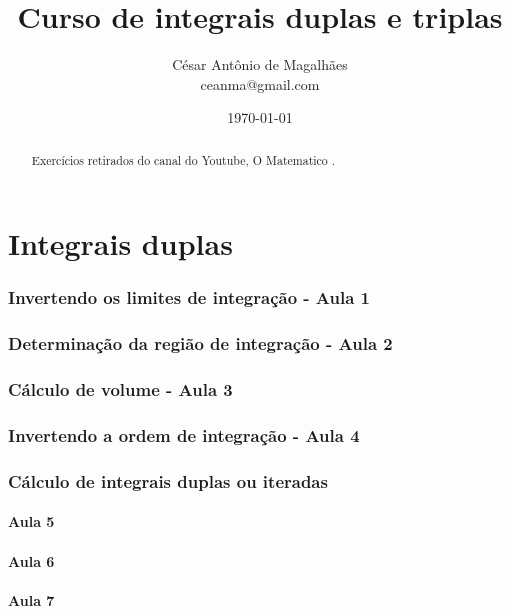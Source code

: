 \documentclass[12pt, a4paper]{article}
\title{Curso de integrais duplas e triplas}
\author{César Antônio de Magalhães \\ ceanma@gmail.com}
\date{\today}
\begin{document}
	\maketitle
	
	\tableofcontents
	
	\listoftables
	
	\listoffigures
	
	\begin{abstract}
		Exercícios retirados do canal do Youtube, O Matematico \cite{curso_integrais_duplas_triplas}.	
	\end{abstract}
	
	\part{Integrais duplas}	
		\section{Invertendo os limites de integração - Aula 1}			
					
		\section{Determinação da região de integração - Aula 2}		
					
		\section{Cálculo de volume - Aula 3}
					
		\section{Invertendo a ordem de integração - Aula 4}
					
		\section{Cálculo de integrais duplas ou iteradas}
			\subsection{Aula 5}
						
			\subsection{Aula 6}
						
			\subsection{Aula 7}
						
\end{document}
